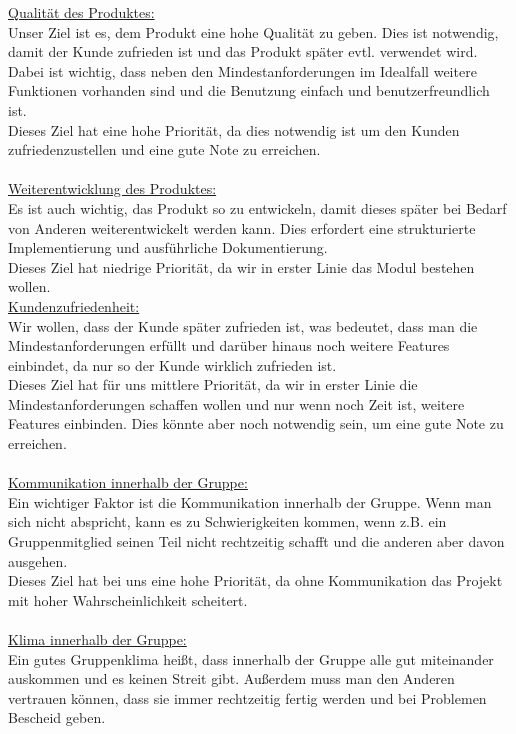 \documentclass[fontsize=12pt,paper=a4,twoside]{scrartcl}
\begin{document}
\underline{Qualität des Produktes:} \\
Unser Ziel ist es, dem Produkt eine hohe Qualität zu geben. Dies ist notwendig, damit der Kunde zufrieden ist und das Produkt später evtl. verwendet wird. Dabei ist wichtig, dass neben den Mindestanforderungen im Idealfall weitere Funktionen vorhanden sind und die Benutzung einfach und benutzerfreundlich ist.\\
Dieses Ziel hat eine hohe Priorität, da dies notwendig ist um den Kunden zufriedenzustellen und eine gute Note zu erreichen.\\
\bigskip \\
\underline{Weiterentwicklung des Produktes:} \\
Es ist auch wichtig, das Produkt so zu entwickeln, damit dieses später bei Bedarf von Anderen weiterentwickelt werden kann. Dies erfordert eine strukturierte Implementierung und ausführliche Dokumentierung.\\
Dieses Ziel hat niedrige Priorität, da wir in erster Linie das Modul bestehen wollen.
\bigskip \\
\underline{Kundenzufriedenheit:}\\
Wir wollen, dass der Kunde später zufrieden ist, was bedeutet, dass man die Mindestanforderungen erfüllt und darüber hinaus noch weitere Features einbindet, da nur so der Kunde wirklich zufrieden ist. \\
Dieses Ziel hat für uns mittlere Priorität, da wir in erster Linie die Mindestanforderungen schaffen wollen und nur wenn noch Zeit ist, weitere Features einbinden. Dies könnte aber noch notwendig sein, um eine gute Note zu erreichen.\\
\bigskip \\
\underline{Kommunikation innerhalb der Gruppe:} \\
Ein wichtiger Faktor ist die Kommunikation innerhalb der Gruppe. Wenn man sich nicht abspricht, kann es zu Schwierigkeiten kommen, wenn z.B. ein Gruppenmitglied seinen Teil nicht rechtzeitig schafft und die anderen aber davon ausgehen.\\
Dieses Ziel hat bei uns eine hohe Priorität, da ohne Kommunikation das Projekt mit hoher Wahrscheinlichkeit scheitert.\\
\bigskip \\
\underline{Klima innerhalb der Gruppe:} \\
Ein gutes Gruppenklima heißt, dass innerhalb der Gruppe alle gut miteinander auskommen und es keinen Streit gibt. Außerdem muss man den Anderen vertrauen können, dass sie immer rechtzeitig fertig werden und bei Problemen Bescheid geben.\\
\end{document}

